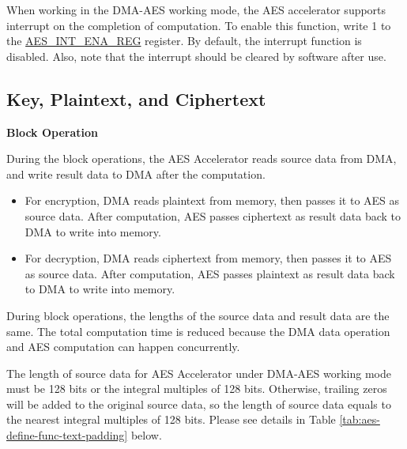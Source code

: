 \documentclass[main\_\_EN.tex]{subfiles}
\begin{document}
When working in the DMA-AES working mode, the AES accelerator supports interrupt on the completion of computation. To enable this function, write 1 to the \hyperref[regdesc:AESINTENAREG]{AES\_INT\_ENA\_REG} register. By default, the interrupt function is disabled. Also, note that the interrupt should be cleared by software after use.


\subsection{Key, Plaintext, and Ciphertext}

\textbf{Block Operation}

During the block operations, the AES Accelerator reads source data from DMA, and write result data to DMA after the computation.

\begin{itemize}
    \item For encryption, DMA reads plaintext from memory, then passes it to AES as source data. After computation, AES passes ciphertext as result data  back to DMA to write into memory.
    \item For decryption, DMA reads ciphertext from memory, then passes it to AES as source data. After computation, AES passes plaintext as result data back to DMA to write into memory. 
\end{itemize}

During block operations, the lengths of the source data and result data are the same. The total computation time is reduced because the DMA data operation and AES computation can happen concurrently.

\label{api:testpadding}The length of source data for AES Accelerator under DMA-AES working mode must be 128 bits or the integral multiples of 128 bits. Otherwise, trailing zeros will be added to the original source data, so the length of source data equals to the nearest integral multiples of 128 bits. Please see details in Table \ref{tab:aes-define-func-text-padding} below.

\end{document}
